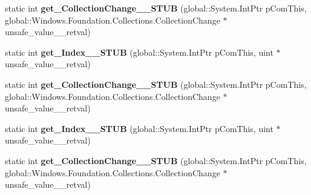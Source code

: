 \begin{DoxyCompactItemize}
\item 
\mbox{\label{struct_windows_1_1_foundation_1_1_collections_1_1_i_vector_changed_event_args_____impl_1_1_vtbl_ac8b493654b0d9c8005afdb179f088f82}} 
static int {\bfseries get\+\_\+\+Collection\+Change\+\_\+\+\_\+\+S\+T\+UB} (global\+::\+System.\+Int\+Ptr p\+Com\+This, global\+::\+Windows.\+Foundation.\+Collections.\+Collection\+Change $\ast$unsafe\+\_\+value\+\_\+\+\_\+retval)
\item 
\mbox{\label{struct_windows_1_1_foundation_1_1_collections_1_1_i_vector_changed_event_args_____impl_1_1_vtbl_a06e74647ee84efadaa99e3ed5bf6b337}} 
static int {\bfseries get\+\_\+\+Index\+\_\+\+\_\+\+S\+T\+UB} (global\+::\+System.\+Int\+Ptr p\+Com\+This, uint $\ast$unsafe\+\_\+value\+\_\+\+\_\+retval)
\item 
\mbox{\label{struct_windows_1_1_foundation_1_1_collections_1_1_i_vector_changed_event_args_____impl_1_1_vtbl_ac8b493654b0d9c8005afdb179f088f82}} 
static int {\bfseries get\+\_\+\+Collection\+Change\+\_\+\+\_\+\+S\+T\+UB} (global\+::\+System.\+Int\+Ptr p\+Com\+This, global\+::\+Windows.\+Foundation.\+Collections.\+Collection\+Change $\ast$unsafe\+\_\+value\+\_\+\+\_\+retval)
\item 
\mbox{\label{struct_windows_1_1_foundation_1_1_collections_1_1_i_vector_changed_event_args_____impl_1_1_vtbl_a06e74647ee84efadaa99e3ed5bf6b337}} 
static int {\bfseries get\+\_\+\+Index\+\_\+\+\_\+\+S\+T\+UB} (global\+::\+System.\+Int\+Ptr p\+Com\+This, uint $\ast$unsafe\+\_\+value\+\_\+\+\_\+retval)
\item 
\mbox{\label{struct_windows_1_1_foundation_1_1_collections_1_1_i_vector_changed_event_args_____impl_1_1_vtbl_ac8b493654b0d9c8005afdb179f088f82}} 
static int {\bfseries get\+\_\+\+Collection\+Change\+\_\+\+\_\+\+S\+T\+UB} (global\+::\+System.\+Int\+Ptr p\+Com\+This, global\+::\+Windows.\+Foundation.\+Collections.\+Collection\+Change $\ast$unsafe\+\_\+value\+\_\+\+\_\+retval)

\end{DoxyCompactItemize}

